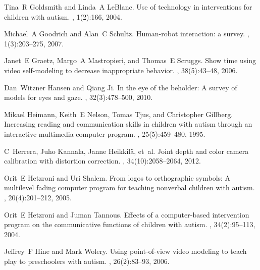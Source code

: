 \documentclass{ut-thesis}
\begin{document}
\begin{thebibliography}{100}
Tina~R Goldsmith and Linda~A LeBlanc.
\newblock Use of technology in interventions for children with autism.
, 1(2):166,
  2004.

Michael~A Goodrich and Alan~C Schultz.
\newblock Human-robot interaction: a survey.
,
  1(3):203--275, 2007.

Janet~E Graetz, Margo~A Mastropieri, and Thomas~E Scruggs.
\newblock Show time using video self-modeling to decrease inappropriate
  behavior.
, 38(5):43--48, 2006.

Dan~Witzner Hansen and Qiang Ji.
\newblock In the eye of the beholder: A survey of models for eyes and gaze.
, 32(3):478--500, 2010.

Mikael Heimann, Keith~E Nelson, Tomas Tjus, and Christopher Gillberg.
\newblock Increasing reading and communication skills in children with autism
  through an interactive multimedia computer program.
, 25(5):459--480,
  1995.

C~Herrera, Juho Kannala, Janne Heikkil{\"a}, et~al.
\newblock Joint depth and color camera calibration with distortion correction.
, 34(10):2058--2064, 2012.

Orit~E Hetzroni and Uri Shalem.
\newblock From logos to orthographic symbols: A multilevel fading computer
  program for teaching nonverbal children with autism.
,
  20(4):201--212, 2005.

Orit~E Hetzroni and Juman Tannous.
\newblock Effects of a computer-based intervention program on the communicative
  functions of children with autism.
, 34(2):95--113,
  2004.

Jeffrey~F Hine and Mark Wolery.
\newblock Using point-of-view video modeling to teach play to preschoolers with
  autism.
, 26(2):83--93,
  2006.


\end{thebibliography}
\end{document}
